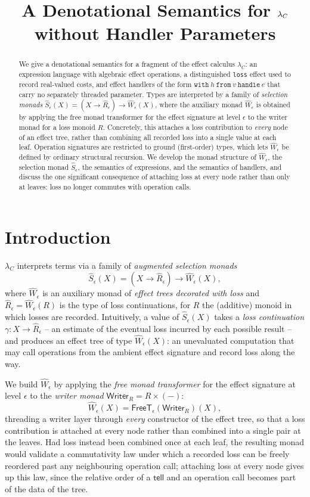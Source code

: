 \documentclass[11pt]{article}
\title{A Denotational Semantics for $\lC$ without Handler Parameters}
\author{}
\date{}
\theoremstyle{plain}
\newcommand{\Wm}[1]{\widehat{W}_{#1}}
\newcommand{\Rm}[1]{\widehat{R}_{#1}}
\newcommand{\eps}{\epsilon}
\newcommand{\tell}{\mathsf{tell}}
\newcommand{\lC}{\lambda_C}
\begin{document}
\maketitle

\begin{abstract}
We give a denotational semantics for a fragment of the effect calculus $\lC$: an
expression language with algebraic effect operations, a distinguished \texttt{loss}
effect used to record real-valued costs, and effect handlers of the form $\mathtt{with}\
h\ \mathtt{from}\ v\ \mathtt{handle}\ e$ that carry no separately threaded parameter.
Types are interpreted by a family of \emph{selection monads}
$\widehat S_\eps(X) = (X\to \Rm\eps)\to \Wm\eps(X)$, where the auxiliary monad
$\Wm\eps$ is obtained by applying the free monad transformer for the effect signature at
level $\eps$ to the writer monad for a loss monoid $R$. Concretely, this attaches a loss
contribution to \emph{every} node of an effect tree, rather than combining all recorded
loss into a single value at each leaf. Operation signatures are restricted to ground
(first-order) types, which lets $\Wm\eps$ be defined by ordinary structural recursion. We
develop the monad structure of $\Wm\eps$, the selection monad $\widehat S_\eps$, the
semantics of expressions, and the semantics of handlers, and discuss the one significant
consequence of attaching loss at every node rather than only at leaves: loss no longer
commutes with operation calls.
\end{abstract}

\section{Introduction}

$\lC$ interprets terms via a family of \emph{augmented selection monads}
\[
  \widehat S_\eps(X) = (X\to \Rm\eps)\to \Wm\eps(X),
\]
where $\Wm\eps$ is an auxiliary monad of \emph{effect trees decorated with loss} and
$\Rm\eps = \Wm\eps(R)$ is the type of loss continuations, for $R$ the (additive) monoid in
which losses are recorded. Intuitively, a value of $\widehat S_\eps(X)$ takes a \emph{loss
continuation} $\gamma:X\to\Rm\eps$ -- an estimate of the eventual loss incurred by each
possible result -- and produces an effect tree of type $\Wm\eps(X)$: an unevaluated
computation that may call operations from the ambient effect signature and record loss
along the way.

We build $\Wm\eps$ by applying the \emph{free monad transformer} for the effect signature
at level $\eps$ to the \emph{writer monad} $\mathsf{Writer}_R = R\times({-})$:
\[
  \Wm\eps(X) = \mathsf{FreeT}_\eps(\mathsf{Writer}_R)(X),
\]
threading a writer layer through \emph{every} constructor of the effect tree, so that a
loss contribution is attached at every node rather than combined into a single pair at the
leaves. Had loss instead been combined once at each leaf, the resulting monad would
validate a commutativity law under which a recorded loss can be freely reordered past any
neighbouring operation call; attaching loss at every node gives up this law, since the
relative order of a $\tell$ and an operation call becomes part of the data of the tree.
\end{document}
